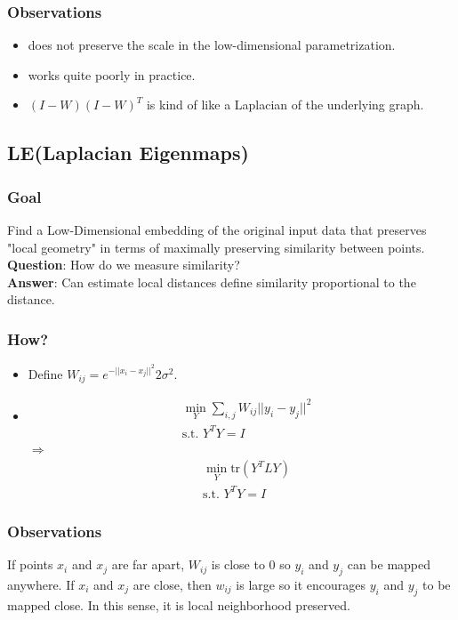 \subsubsection*{Observations}
\begin{itemize}
\item does not preserve the scale in the low-dimensional parametrization.
\item works quite poorly in practice.
\item $(I-W)(I-W)^T$ is kind of like a Laplacian of the underlying graph.
\end{itemize}

\subsection*{LE(Laplacian Eigenmaps)}
\subsubsection*{Goal}
Find a Low-Dimensional embedding of the original input data that
preserves "local geometry" in terms of maximally preserving similarity
between points. 
\textbf{Question}: How do we measure similarity?\\
\textbf{Answer}: Can estimate local distances define similarity
proportional to the distance. 
\subsubsection*{How?}
\begin{itemize}
\item Define $W_{ij}=e^{-||x_i-x_j||^2}{2\sigma^2}$.
\item 
\begin{align*}
&\min_{Y} \sum_{i,j} W_{ij} ||y_i-y_j||^2\\
&\text{s.t. } Y^T Y=I
\end{align*}
$\Rightarrow$
\begin{align*}
&\min_{Y} \text{tr} (Y^T LY)\\
&\text{s.t. } Y^T Y=I
\end{align*}
\end{itemize}
\subsubsection*{Observations}
If points $x_i$ and $x_j$ are far apart, $W_{ij}$ is close to 0 so
$y_i$ and $y_j$ can be mapped anywhere. If $x_i$ and $x_j$ are close,
then $w_{ij}$ is large so it encourages $y_i$ and $y_j$ to be mapped
close. In this sense, it is local neighborhood preserved. 

